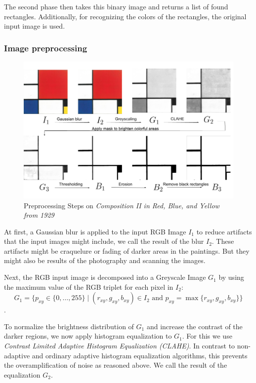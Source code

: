 \documentclass[serif,article,noparskip]{agse-thesis}
\begin{document}
The second phase then takes this binary image and returns a list of found
rectangles. Additionally, for recognizing the colors of the rectangles, the
original input image is used.

\subsubsection{Image preprocessing} \label{preprocessing}

\begin{figure}
  \includegraphics[width=\linewidth]{images/preprocessing_steps.png}
  \caption{Preprocessing Steps on \textit{Composition II in Red, Blue, and Yellow
  from 1929}}
  \label{fig:preprocessing}
\end{figure}

At first, a Gaussian blur is applied to the input RGB Image $I_1$ to reduce
artifacts that the input images might include, we call the result of the blur
$I_2$. These artifacts might be craquelure or fading of darker areas in the
paintings. But they might also be results of the photography and scanning the
images.

Next, the RGB input image is decomposed into a Greyscale Image $G_1$ by using
the maximum value of the RGB triplet for each pixel in $I_2$:
$$G_1 = \{p_{xy} \in \{0,\ldots,255\} \mid (r_{xy},g_{xy},b_{xy})\in I_2\text{ and }p_{xy}=\max\{r_{xy},g_{xy},b_{xy}\}\}$$.

To normalize the brightness distribution of $G_1$ and increase the contrast of
the darker regions, we now apply histogram equalization to $G_1$. For this we
use \textit{Contrast Limited Adaptive Histogram Equalization (CLAHE)}. In
contrast to non-adaptive and ordinary adaptive histogram equalization
algorithms, this prevents the overamplification of noise as reasoned above. We
call the result of the equalization $G_2$. \cite{Pizer1987}
\end{document}

